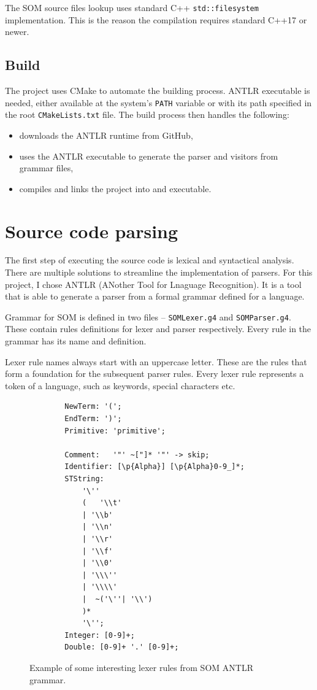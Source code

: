 \documentclass[thesis=M,english]{FITthesis}[2019/12/23]
\begin{document}
The SOM source files lookup uses standard C++ \texttt{std::filesystem} implementation. This is the reason the compilation requires
standard C++17 or newer.

\subsection{Build}
The project uses CMake to automate the building process. ANTLR executable is needed, either available at the system's \texttt{PATH}
variable or with its path specified in the root \texttt{CMakeLists.txt} file. The build process then handles the following:
\begin{itemize}
	\item downloads the ANTLR runtime from GitHub,
	\item uses the ANTLR executable to generate the parser and visitors from grammar files,
	\item compiles and links the project into and executable.
\end{itemize}

\section{Source code parsing}
The first step of executing the source code is lexical and syntactical analysis. There are multiple solutions to streamline the
implementation of parsers. For this project, I chose ANTLR (ANother Tool for Lnaguage Recognition). It is a tool that is able
to generate a parser from a formal grammar defined for a language.

Grammar for SOM is defined in two files -- \texttt{SOMLexer.g4} and \texttt{SOMParser.g4}. These contain rules definitions for
lexer and parser respectively. Every rule in the grammar has its name and definition.

Lexer rule names always start with an uppercase letter. These are the rules that form a foundation for the subsequent parser rules.
Every lexer rule represents a token of a language, such as keywords, special characters etc. 

\begin{figure}
	\centering
	\begin{verbatim}
		NewTerm: '(';
		EndTerm: ')';
		Primitive: 'primitive';

		Comment:   '"' ~["]* '"' -> skip;
		Identifier: [\p{Alpha}] [\p{Alpha}0-9_]*;
		STString:
    		'\''
    		(   '\\t'
      		| '\\b'
      		| '\\n'
      		| '\\r'
      		| '\\f'
      		| '\\0'
      		| '\\\''
      		| '\\\\'
      		|  ~('\''| '\\')
    		)*
    		'\'';
		Integer: [0-9]+;
		Double: [0-9]+ '.' [0-9]+;	
	\end{verbatim}
	\caption{Example of some interesting lexer rules from SOM ANTLR grammar.}
	\label{fig:antlr_lexer}
\end{figure}
\end{document}
